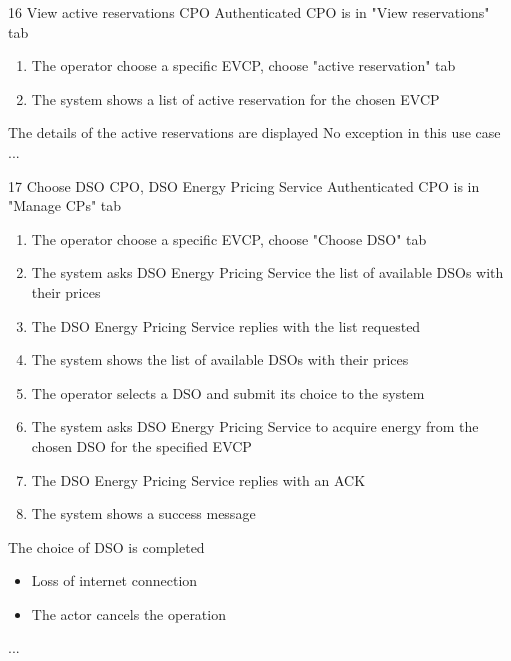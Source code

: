 \usecase
{16}
{View active reservations} %
{CPO} %
{Authenticated CPO is in "View reservations" tab} %
{ %
    \begin{enumerate}
        \item The operator choose a specific EVCP, choose "active reservation" tab
        \item The system shows a list of active reservation for the chosen EVCP
    \end{enumerate}
}
{The details of the active reservations are displayed} %
{ %
    No exception in this use case
}
{ %
    ...
}

\usecase
{17}
{Choose DSO} %
{CPO, DSO Energy Pricing Service} %
{Authenticated CPO is in "Manage CPs" tab} %
{ %
    \begin{enumerate}
        \item The operator choose a specific EVCP, choose "Choose DSO" tab
        \item The system asks DSO Energy Pricing Service the list of available DSOs with their prices
        \item The DSO Energy Pricing Service replies with the list requested
        \item The system shows the list of available DSOs with their prices
        \item The operator selects a DSO and submit its choice to the system
        \item The system asks DSO Energy Pricing Service to acquire energy from the chosen DSO for the specified EVCP
        \item The DSO Energy Pricing Service replies with an ACK
        \item The system shows a success message
    \end{enumerate}
}
{The choice of DSO is completed} %
{ %
    \begin{itemize}
        \item Loss of internet connection
        \item The actor cancels the operation
    \end{itemize}
}
{ %
    ...
}

